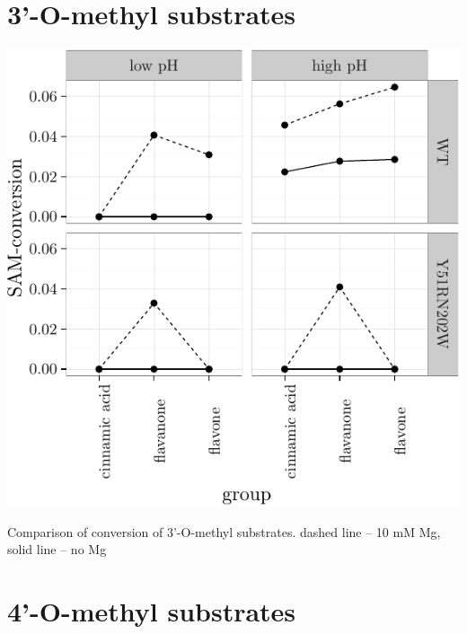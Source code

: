 \documentclass[]{tufte-handout}
\begin{document}
\section{3'-O-methyl substrates}\label{o-methyl-substrates}

\begin{marginfigure}
 \includegraphics{tufte_files/figure-latex/plot_conversion_3Ome-1.pdf}
\caption{Comparison of conversion of 3'-O-methyl substrates. dashed line -- 10 mM Mg, solid line -- no Mg}
\end{marginfigure}

\section{4'-O-methyl substrates}\label{o-methyl-substrates-1}
\end{document}
